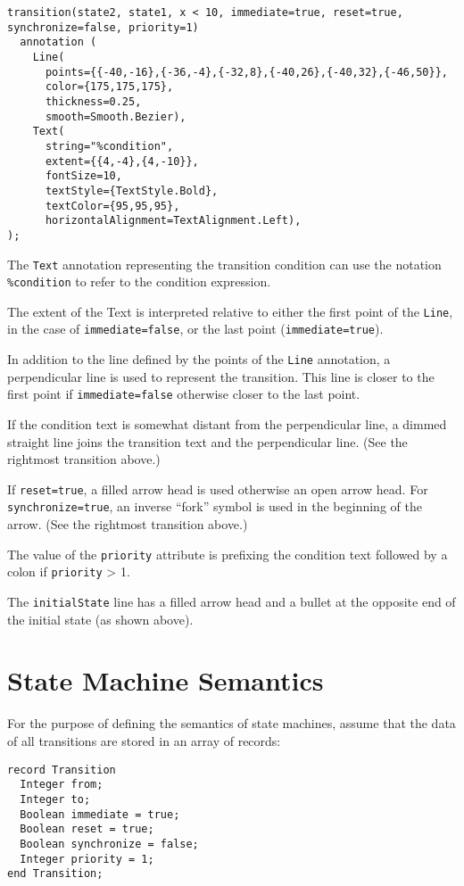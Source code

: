 \begin{example}
\begin{lstlisting}[language=modelica]
transition(state2, state1, x < 10, immediate=true, reset=true, synchronize=false, priority=1)
  annotation (
    Line(
      points={{-40,-16},{-36,-4},{-32,8},{-40,26},{-40,32},{-46,50}},
      color={175,175,175},
      thickness=0.25,
      smooth=Smooth.Bezier),
    Text(
      string="%condition",
      extent={{4,-4},{4,-10}},
      fontSize=10,
      textStyle={TextStyle.Bold},
      textColor={95,95,95},
      horizontalAlignment=TextAlignment.Left),
);
\end{lstlisting}
\end{example}

The \lstinline!Text! annotation representing the transition condition can use the notation \lstinline!%condition! to refer to the condition expression.

The extent of the Text is interpreted relative to either the first point of the \lstinline!Line!, in the case of \lstinline!immediate=false!, or the last point (\lstinline!immediate=true!).

In addition to the line defined by the points of the \lstinline!Line! annotation, a perpendicular line is used to represent the transition.  This line is closer to the first point if \lstinline!immediate=false! otherwise closer to the last point.

If the condition text is somewhat distant from the perpendicular line, a dimmed straight line joins the transition text and the perpendicular line.  (See the rightmost transition above.)

If \lstinline!reset=true!, a filled arrow head is used otherwise an open arrow head.
For \lstinline!synchronize=true!, an inverse ``fork'' symbol is used in the
beginning of the arrow.  (See the rightmost transition above.)

The value of the \lstinline!priority! attribute is prefixing the condition text
followed by a colon if \lstinline!priority! \textgreater{} 1.

The \lstinline!initialState! line has a filled arrow head and a bullet at the
opposite end of the initial state (as shown above).

\section{State Machine Semantics}\label{state-machine-semantics}

For the purpose of defining the semantics of state machines, assume that
the data of all transitions are stored in an array of records:
\begin{lstlisting}[language=modelica]
record Transition
  Integer from;
  Integer to;
  Boolean immediate = true;
  Boolean reset = true;
  Boolean synchronize = false;
  Integer priority = 1;
end Transition;
\end{lstlisting}


